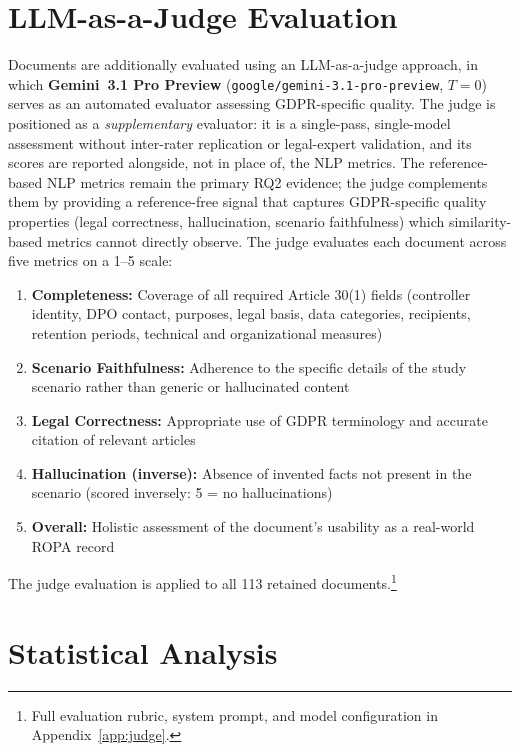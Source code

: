\section{LLM-as-a-Judge Evaluation}
Documents are additionally evaluated using an LLM-as-a-judge approach, in which \textbf{Gemini~3.1 Pro Preview} (\texttt{google/gemini-3.1-pro-preview}, $T = 0$) serves as an automated evaluator assessing GDPR-specific quality. The judge is positioned as a \emph{supplementary} evaluator: it is a single-pass, single-model assessment without inter-rater replication or legal-expert validation, and its scores are reported alongside, not in place of, the NLP metrics. The reference-based NLP metrics remain the primary RQ2 evidence; the judge complements them by providing a reference-free signal that captures GDPR-specific quality properties (legal correctness, hallucination, scenario faithfulness) which similarity-based metrics cannot directly observe. The judge evaluates each document across five metrics on a 1--5 scale:
\begin{enumerate}
    \item \textbf{Completeness:} Coverage of all required Article 30(1) fields (controller identity, DPO contact, purposes, legal basis, data categories, recipients, retention periods, technical and organizational measures)
    \item \textbf{Scenario Faithfulness:} Adherence to the specific details of the study scenario rather than generic or hallucinated content
    \item \textbf{Legal Correctness:} Appropriate use of GDPR terminology and accurate citation of relevant articles
    \item \textbf{Hallucination (inverse):} Absence of invented facts not present in the scenario (scored inversely: 5 = no hallucinations)
    \item \textbf{Overall:} Holistic assessment of the document's usability as a real-world ROPA record
\end{enumerate}
The judge evaluation is applied to all 113 retained documents.\footnote{Full evaluation rubric, system prompt, and model configuration in Appendix~\ref{app:judge}.}



\section{Statistical Analysis}
\label{sec:stat-analysis}

